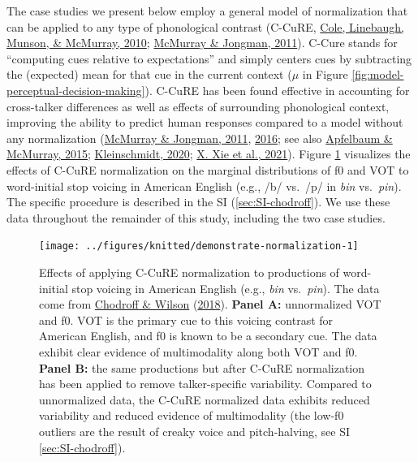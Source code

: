 \documentclass[
  11pt,
  english,
  man,floatsintext]{apa6}
\begin{document}
The case studies we present below employ a general model of normalization that can be applied to any type of phonological contrast (C-CuRE, \protect\hyperlink{ref-cole2010}{Cole, Linebaugh, Munson, \& McMurray, 2010}; \protect\hyperlink{ref-mcmurray-jongman2011}{McMurray \& Jongman, 2011}). C-Cure stands for ``computing cues relative to expectations'' and simply centers cues by subtracting the (expected) mean for that cue in the current context (\(\mu\) in Figure \ref{fig:model-perceptual-decision-making}). C-CuRE has been found effective in accounting for cross-talker differences as well as effects of surrounding phonological context, improving the ability to predict human responses compared to a model without any normalization (\protect\hyperlink{ref-mcmurray-jongman2011}{McMurray \& Jongman, 2011}, \protect\hyperlink{ref-mcmurray-jongman2016}{2016}; see also \protect\hyperlink{ref-apfelbaum-mcmurray2015}{Apfelbaum \& McMurray, 2015}; \protect\hyperlink{ref-kleinschmidt2020}{Kleinschmidt, 2020}; \protect\hyperlink{ref-xie2021cognition}{X. Xie et al., 2021}).
Figure \ref{fig:demonstrate-normalization} visualizes the effects of C-CuRE normalization on the marginal distributions of f0 and VOT to word-initial stop voicing in American English (e.g., /b/ vs.~/p/ in \emph{bin} vs.~\emph{pin}). The specific procedure is described in the SI (\ref{sec:SI-chodroff}). We use these data throughout the remainder of this study, including the two case studies.



\begin{figure}

{\centering \texttt{[image: ../figures/knitted/demonstrate-normalization-1]} 

}

\caption{Effects of applying C-CuRE normalization to productions of word-initial stop voicing in American English (e.g., \emph{bin} vs.~\emph{pin}). The data come from \protect\hyperlink{ref-chodroff-wilson2018}{Chodroff \& Wilson} (\protect\hyperlink{ref-chodroff-wilson2018}{2018}). \textbf{Panel A:} unnormalized VOT and f0. VOT is the primary cue to this voicing contrast for American English, and f0 is known to be a secondary cue. The data exhibit clear evidence of multimodality along both VOT and f0. \textbf{Panel B:} the same productions but after C-CuRE normalization has been applied to remove talker-specific variability. Compared to unnormalized data, the C-CuRE normalized data exhibits reduced variability and reduced evidence of multimodality (the low-f0 outliers are the result of creaky voice and pitch-halving, see SI \ref{sec:SI-chodroff}).}\label{fig:demonstrate-normalization}
\end{figure}
\end{document}

